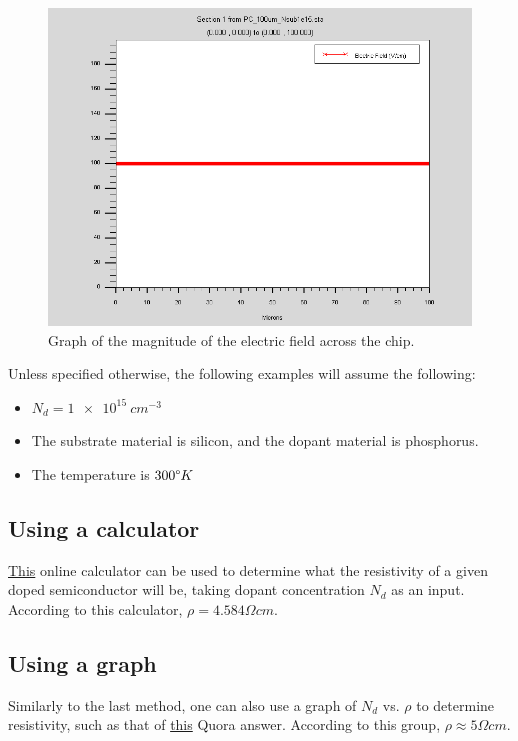 \documentclass[12pt]{article}
\begin{document}
\begin{figure}[ht]
  \centering
  \includegraphics[width=\textwidth]{efield}
  \caption{Graph of the magnitude of the electric field across the chip.}
  \label{fig:efield}
\end{figure}

Unless specified otherwise, the following examples will assume the following:
\begin{itemize}
  \item $N_d=\SI{1e15}{cm^{-3}}$
  \item The substrate material is silicon, and the dopant material is phosphorus.
  \item The temperature is $300{\degree}K$
\end{itemize}

\subsection{Using a calculator}
\href{https://www.pvlighthouse.com.au/resistivity}{This} online calculator can be used to determine what the resistivity of a given doped semiconductor will be, taking dopant concentration $N_d$ as an input. According to this calculator, $\rho=4.584{\Omega}cm$.

\subsection{Using a graph}
Similarly to the last method, one can also use a graph of $N_d$ vs. $\rho$ to determine resistivity, such as that of \href{https://www.quora.com/What-is-the-effect-of-doping-on-resistance}{this} Quora answer. According to this group, $\rho\approx5{\Omega}cm$.
\end{document}
